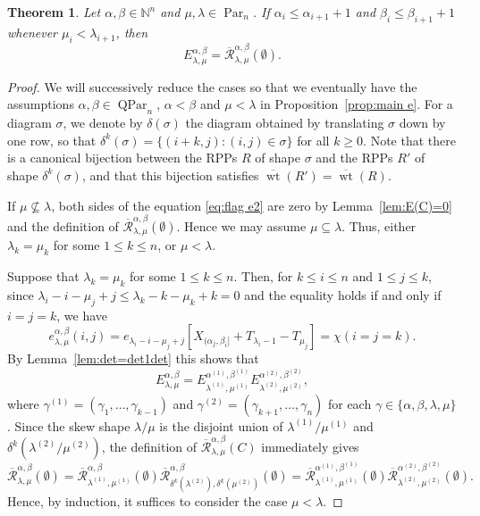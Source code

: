 \documentclass[12pt]{amsart}
\numberwithin{equation}{section}
\newtheorem{thm}{Theorem}[section]
\theoremstyle{definition}
\newcommand\NN{\mathbb{N}}
\newcommand\Par{\operatorname{Par}}
\newcommand\QPar{\operatorname{QPar}}
\newcommand\lm{{\lambda/\mu}}
\newcommand\wt{\operatorname{wt}}
\newcommand\R{\mathcal{R}}
\newcommand\oR{\overline{\R}}
\newcommand\owt{\overline{\wt}}
\begin{document}
\begin{thm}\label{thm:flag e2}
  Let $\alpha,\beta\in\NN^n$ and $\mu,\lambda\in\Par_n$. 
If $\alpha_i\le \alpha_{i+1}+1$ and $\beta_i\le \beta_{i+1}+1$ whenever
$\mu_i<\lambda_{i+1}$, then
\begin{equation}
\label{eq:flag e2}
E_{\lambda,\mu}^{\alpha,\beta} = \oR_{\lambda,\mu}^{\alpha,\beta}(\emptyset).
\end{equation}
\end{thm}
\begin{proof}
  We will successively reduce the cases so that we eventually have the
  assumptions $\alpha,\beta\in\QPar_n$, $\alpha<\beta$ and $\mu<\lambda$ in
  Proposition~\ref{prop:main e}. For a diagram $\sigma$, we denote by
  $\delta(\sigma)$ the diagram obtained by translating $\sigma$ down by one row,
  so that $\delta^k(\sigma)=\{(i+k,j): (i,j)\in \sigma\}$ for all $k\ge0$. Note
  that there is a canonical bijection between the RPPs $R$ of shape $\sigma$ and
  the RPPs $R'$ of shape $\delta^k(\sigma)$, and that this bijection satisfies
  $\owt(R') = \owt(R)$.

  If $\mu\not\subseteq\lambda$, both sides of the equation
  \eqref{eq:flag e2} are zero by
  Lemma~\ref{lem:E(C)=0} and the definition of
  $\oR_{\lambda,\mu}^{\alpha,\beta}(\emptyset)$. Hence we may assume
  $\mu\subseteq\lambda$.
  Thus, either $\lambda_k = \mu_k$ for some $1 \le k \le n$, or $\mu < \lambda$.

  Suppose that $\lambda_k=\mu_k$ for some $1\le k\le n$. Then, for $k\le i\le n$
  and $1\le j\le k$, since $\lambda_i-i-\mu_j+j\le \lambda_k-k-\mu_k+k=0$ and
  the equality holds if and only if $i=j=k$, we have
  \[
    e^{\alpha,\beta}_{\lambda,\mu}(i,j) =
    e_{\lambda_i-i-\mu_j+j}[X_{(\alpha_j,\beta_i]}+T_{\lambda_i-1}-T_{\mu_j}] = \chi(i=j=k).
  \]
  By Lemma~\ref{lem:det=det1det} this shows that
  \[
    E_{\lambda,\mu}^{\alpha,\beta} = E_{\lambda^{(1)},\mu^{(1)}}^{\alpha^{(1)},\beta^{(1)}}
    E_{\lambda^{(2)},\mu^{(2)}}^{\alpha^{(2)},\beta^{(2)}},
  \]
  where $\gamma^{(1)}=(\gamma_1,\dots,\gamma_{k-1})$ and
  $\gamma^{(2)}=(\gamma_{k+1},\dots,\gamma_{n})$ for each
  $\gamma\in\{\alpha,\beta,\lambda,\mu\}$. Since the skew shape $\lm$ is the
  disjoint union of $\lambda^{(1)}/\mu^{(1)}$ and $\delta^k(\lambda^{(2)}/\mu^{(2)})$, the
  definition of $\oR_{\lambda,\mu}^{\alpha,\beta}(C)$ immediately gives
  \[
    \oR_{\lambda,\mu}^{\alpha,\beta}(\emptyset) =
    \oR_{\lambda^{(1)},\mu^{(1)}}^{\alpha,\beta}(\emptyset)
    \oR_{\delta^k(\lambda^{(2)}),\delta^k(\mu^{(2)})}^{\alpha,\beta}(\emptyset)=
    \oR_{\lambda^{(1)},\mu^{(1)}}^{\alpha^{(1)},\beta^{(1)}}(\emptyset)
    \oR_{\lambda^{(2)},\mu^{(2)}}^{\alpha^{(2)},\beta^{(2)}}(\emptyset).
  \]
  Hence, by induction, it suffices to consider the case $\mu<\lambda$.


\end{proof}
\end{document}
